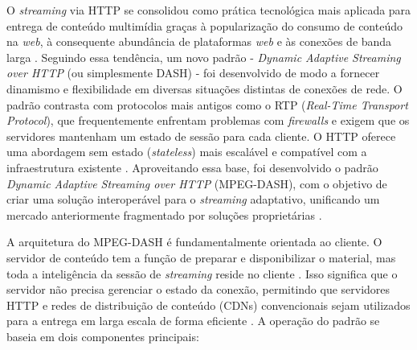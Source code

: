 O \textit{streaming} via HTTP se consolidou como prática tecnológica mais aplicada para entrega de conteúdo multimídia graças à popularização do consumo de conteúdo na \textit{web}, à consequente abundância de plataformas \textit{web} e às conexões de banda larga \cite{thang2012adaptive}. Seguindo essa tendência, um novo padrão - \textit{Dynamic Adaptive Streaming over HTTP} (ou simplesmente DASH) - foi desenvolvido de modo a fornecer dinamismo e flexibilidade em diversas situações distintas de conexões de rede. O padrão contrasta com protocolos mais antigos como o RTP (\textit{Real-Time Transport Protocol}), que frequentemente enfrentam problemas com \textit{firewalls} e exigem que os servidores mantenham um estado de sessão para cada cliente. O HTTP oferece uma abordagem sem estado (\textit{stateless}) mais escalável e compatível com a infraestrutura existente \cite{sodagar2011mpegdash}. Aproveitando essa base, foi desenvolvido o padrão \textit{Dynamic Adaptive Streaming over HTTP} (MPEG-DASH), com o objetivo de criar uma solução interoperável para o \textit{streaming} adaptativo, unificando um mercado anteriormente fragmentado por soluções proprietárias \cite{sodagar2011mpegdash}.

A arquitetura do MPEG-DASH é fundamentalmente orientada ao cliente. O servidor de conteúdo tem a função de preparar e disponibilizar o material, mas toda a inteligência da sessão de \textit{streaming} reside no cliente \cite{stockhammer2011dynamic}. Isso significa que o servidor não precisa gerenciar o estado da conexão, permitindo que servidores HTTP e redes de distribuição de conteúdo (CDNs) convencionais sejam utilizados para a entrega em larga escala de forma eficiente \cite{stockhammer2011dynamic}. A operação do padrão se baseia em dois componentes principais:

